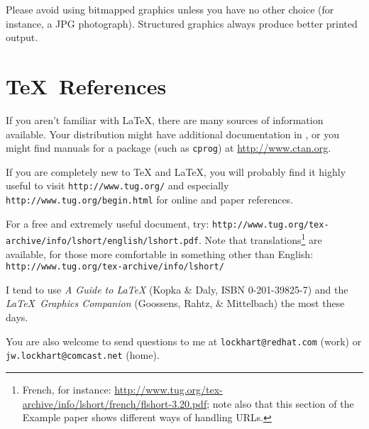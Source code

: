 \documentclass[final]{ols}
\providecommand{\XFjwlA}{lockhart}
\providecommand{\XFjwlDomA}{redhat.com}
\providecommand{\XFjwlB}{jw.lockhart}
\providecommand{\XFjwlDomB}{comcast.net}
\begin{document}
Please avoid using bitmapped graphics unless you have no other choice
(for instance, a JPG photograph).  Structured graphics always produce
better printed output.

\section{\TeX\ References}

If you aren't familiar with {\LaTeX}, there are many sources of
information available.  Your distribution might have additional
documentation in , or you might find manuals
for a package (such as \texttt{cprog}) at {\small\url{http://www.ctan.org}}.

If you are completely new to {\TeX} and {\LaTeX}, you will probably
find it highly useful to visit \texttt{\small http://www.tug.org/} and
especially \texttt{\small http://www.tug.org/begin.html} for online
and paper references.

For a free and extremely useful document, try:
\texttt{\small http://www.tug.org\linebreak[0]/tex-archive\linebreak[0]/info\linebreak[0]/lshort\linebreak[0]/english\linebreak[0]/lshort.pdf}.  
Note that translations\footnote{French, for instance:
\url{http://www.tug.org/tex-archive/info/lshort/french/flshort-3.20.pdf};
note also that this section of the Example paper shows different ways
of handling URLs.}
are available, for those more comfortable in something other than
English: 
\texttt{\small http://www.tug.org\linebreak[0]/tex-archive\linebreak[0]/info\linebreak[0]/lshort/}


I tend to use \textit{A Guide to \LaTeX} (Kopka \& Daly, ISBN 0-201-39825-7) and the
\textit{\LaTeX\ Graphics Companion} (Goossens, Rahtz, \& Mittelbach)
the most these days.

You are also welcome to send questions to me at
\texttt{{\XFjwlA}{@}{\XFjwlDomA}} (work) or
\texttt{{\XFjwlB}{@}{\XFjwlDomB}} (home).
%
%
\end{document}
